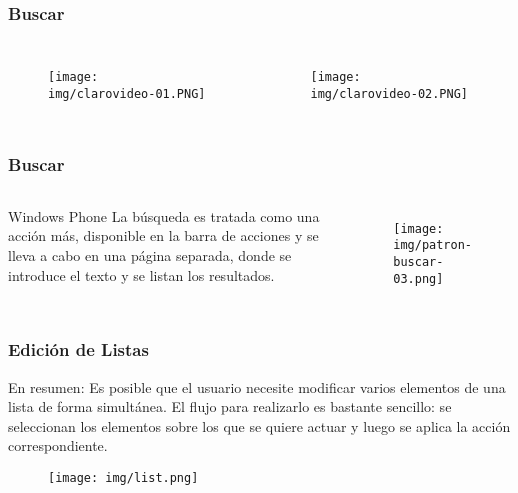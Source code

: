 \documentclass{beamer}
\begin{document}
\begin{frame}
\frametitle{Buscar}

\begin{columns}[c] %

\begin{figure}[H]
  \centering
  \texttt{[image: img/clarovideo-01.PNG]}
\end{figure}

\begin{figure}[H]
  \centering
  \texttt{[image: img/clarovideo-02.PNG]}
\end{figure}

\end{columns}
\end{frame}


\begin{frame}
\frametitle{Buscar}

\begin{columns}[c] %

\begin{block}{Windows Phone}
\justify
La búsqueda es tratada como una acción más, disponible en la barra de acciones y se lleva a cabo en una página separada, donde se introduce el texto y se listan los resultados.
\end{block}

\begin{figure}[H]
  \centering
  \texttt{[image: img/patron-buscar-03.png]}
\end{figure}
\end{columns}
\end{frame}


\begin{frame}
\frametitle{Edición de Listas}

\begin{block}{En resumen:}
\justify
Es posible que el usuario necesite modificar varios elementos de una lista de forma simultánea. El flujo para realizarlo es bastante sencillo: se seleccionan los elementos sobre los que se quiere actuar y luego se aplica la acción correspondiente.
\end{block}
\begin{figure}[H]
  \centering
  \texttt{[image: img/list.png]}
\end{figure}
\end{frame}
\end{document}
